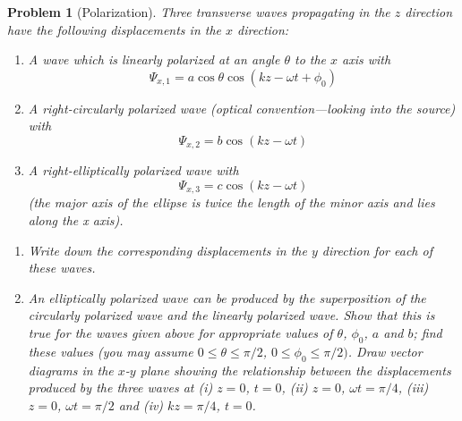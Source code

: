 \documentclass[a4paper]{article}
\theoremstyle{new}
\newtheorem{qns}{Problem}[section]
\begin{document}
\newpage
\begin{qns}[Polarization]
Three transverse waves propagating in the $z$ direction have the following displacements in the $x$ direction:
\begin{enumerate}
    \item A wave which is linearly polarized at an angle $\theta$ to the $x$ axis with
    $$\Psi_{x,1}=a\cos\theta\cos(kz-\omega t+\phi_0)$$
    \item A right-circularly polarized wave (optical convention—looking into the source) with
    $$\Psi_{x,2}=b\cos(kz-\omega t)$$
    \item A right-elliptically polarized wave with
    $$\Psi_{x,3}=c\cos(kz-\omega t)$$
    (the major axis of the ellipse is twice the length of the minor axis and lies along the x axis).
\end{enumerate}
\begin{enumerate}[label=(\alph*)]
    \item Write down the corresponding displacements in the $y$ direction for each of these waves.
    \item An elliptically polarized wave can be produced by the superposition of the circularly polarized wave and the linearly polarized wave. Show that this is true for the waves given above for appropriate values of $\theta$, $\phi_0$, $a$ and $b$; find these values (you may assume $0\leq\theta\leq\pi/2$, $0\leq\phi_0\leq\pi/2)$. Draw vector diagrams in the $x$-$y$ plane showing the relationship between the displacements produced by the three waves at (i) $z = 0$, $t = 0$, (ii) $z = 0$, $\omega t =\pi/4$, (iii) $z = 0$, $\omega t = \pi/2$ and (iv) $kz = \pi/4$, $t = 0$. 
\end{enumerate}
\end{qns}
\end{document}
